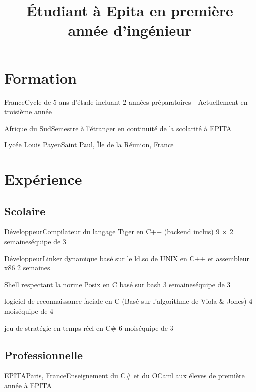 \documentclass[11pt,a4paper]{moderncv}
\title{Étudiant \`a Epita en premi\`ere ann\'ee d'ing\'enieur}
\begin{document}
\makecvtitle

\section{Formation}

{France}{Cycle de 5 ans d'\'etude incluant 2 ann\'ees pr\'eparatoires -
Actuellement en troisi\`eme ann\'ee}

{Afrique du Sud}{Semestre \`a l'\'etranger en continuit\'e de la scolarit\'e \`a EPITA}

{Lyc\'ee Louis Payen}{Saint Paul, Île de la R\'eunion, France}{}{}

\section{Expérience}

\subsection{Scolaire}

{D\'eveloppeur}{Compilateur du langage Tiger en C++ (backend inclus)}
{9 $\times$ 2 semaines}{\'equipe de 3}{}

{D\'eveloppeur}{Linker dynamique bas\'e sur le ld.so de UNIX en C++ et assembleur x86}
{2 semaines}{}{}

{Shell respectant la norme Posix en C bas\'e sur bash}
{3 semaines}{\'equipe de 3}{}

{logiciel de reconnaissance faciale en C (Bas\'e sur l'algorithme de Viola \& Jones)}
{4 mois}{\'equipe de 4}{}

{jeu de strat\'egie en temps r\'eel en C\#}
{6 mois}{\'equipe de 3}{}

\subsection{Professionnelle}

{EPITA}{Paris, France}{Enseignement du C\# et du OCaml aux \'eleves de premi\`ere ann\'ee \`a EPITA}{}
\end{document}
